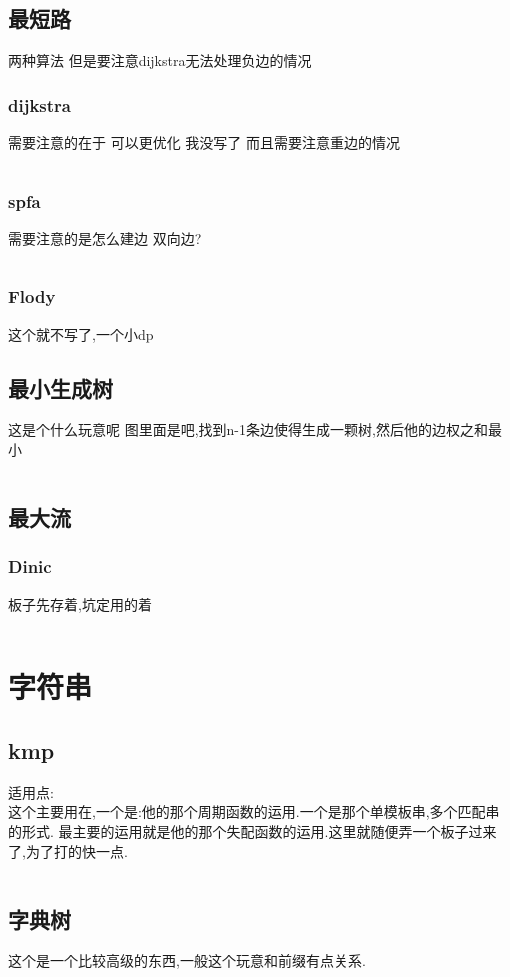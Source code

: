 \documentclass[a4paper,13.6pt]{article}
\begin{document}
\begin{CJK}{UTF8}{gbsn}
\subsection{最短路}
两种算法 但是要注意dijkstra无法处理负边的情况
\subsubsection{dijkstra}
需要注意的在于 可以更优化 我没写了 而且需要注意重边的情况
\inputminted{c++}{../scoure/Graph_theory/dijkstra.cpp}
\subsubsection{spfa}
需要注意的是怎么建边 双向边?
\inputminted{c++}{../scoure/Graph_theory/spfa.cpp}
\subsubsection{Flody}
这个就不写了,一个小dp
\subsection{最小生成树}
这是个什么玩意呢 图里面是吧,找到n-1条边使得生成一颗树,然后他的边权之和最小
\inputminted{c++}{../scoure/Graph_theory/prime.cpp}
\subsection{最大流}
\subsubsection{Dinic}
板子先存着,坑定用的着
\inputminted{c++}{../scoure/Graph_theory/dinic.cpp}
\newpage
\section{字符串}
\subsection{kmp}
适用点:\\
这个主要用在,一个是:他的那个周期函数的运用.一个是那个单模板串,多个匹配串的形式.
最主要的运用就是他的那个失配函数的运用.这里就随便弄一个板子过来了,为了打的快一点.
\inputminted{c++}{../scoure/date/kmp.cpp}
\subsection{字典树}
这个是一个比较高级的东西,一般这个玩意和前缀有点关系.
\inputminted{c++}{../scoure/date/Trie.cpp}

\end{CJK}
\end{document}
